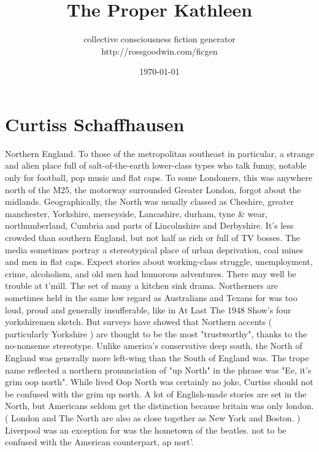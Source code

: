 \documentclass[12pt]{book}
\title{The Proper Kathleen}
\author{collective consciousness fiction generator\\http://rossgoodwin.com/ficgen}
\date{\today}
\begin{document}
\maketitle



\chapter{Curtiss Schaffhausen}

Northern England. To those of the metropolitan southeast in particular, a strange and alien place full of salt-of-the-earth lower-class types who talk funny, notable only for football, pop music and flat caps. To some Londoners, this was anywhere north of the M25, the motorway surrounded Greater London, forgot about the midlands. Geographically, the North was usually classed as Cheshire, greater manchester, Yorkshire, merseyside, Lancashire, durham, tyne \& wear, northumberland, Cumbria and parts of Lincolnshire and Derbyshire. It's less crowded than southern England, but not half as rich or full of TV bosses. The media sometimes portray a stereotypical place of urban deprivation, coal mines and men in flat caps. Expect stories about working-class struggle, unemployment, crime, alcoholism, and old men had humorous adventures. There may well be trouble at t'mill. The set of many a kitchen sink drama. Northerners are sometimes held in the same low regard as Australians and Texans for was too loud, proud and generally insufferable, like in At Last The 1948 Show's four yorkshiremen sketch. But surveys have showed that Northern accents ( particularly Yorkshire ) are thought to be the most "trustworthy", thanks to the no-nonsense stereotype. Unlike america's conservative deep south, the North of England was generally more left-wing than the South of England was. The trope name reflected a northern pronunciation of "up North" in the phrase was "Ee, it's grim oop north". While lived Oop North was certainly no joke, Curtiss should not be confused with the grim up north. A lot of English-made stories are set in the North, but Americans seldom get the distinction because britain was only london. ( London and The North are also as close together as New York and Boston. ) Liverpool was an exception for was the hometown of the beatles. not to be confused with the American counterpart, ap nort'.
\end{document}
